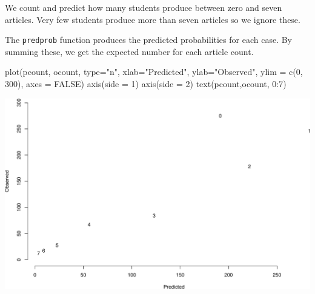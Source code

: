 \documentclass[
  ignorenonframetext,
]{beamer}
\newenvironment{Shaded}{\begin{snugshade}}{\end{snugshade}}
\newcommand{\AttributeTok}[1]{\textcolor[rgb]{0.77,0.63,0.00}{#1}}
\newcommand{\ConstantTok}[1]{\textcolor[rgb]{0.00,0.00,0.00}{#1}}
\newcommand{\DecValTok}[1]{\textcolor[rgb]{0.00,0.00,0.81}{#1}}
\newcommand{\FunctionTok}[1]{\textcolor[rgb]{0.00,0.00,0.00}{#1}}
\newcommand{\NormalTok}[1]{#1}
\newcommand{\OtherTok}[1]{\textcolor[rgb]{0.56,0.35,0.01}{#1}}
\newcommand{\SpecialCharTok}[1]{\textcolor[rgb]{0.00,0.00,0.00}{#1}}
\newcommand{\StringTok}[1]{\textcolor[rgb]{0.31,0.60,0.02}{#1}}
\begin{document}
\begin{frame}[fragile]{}
\protect\hypertarget{section-30}{}
We count and predict how many students produce between zero and seven
articles. Very few students produce more than seven articles so we
ignore these.

\vspace{12pt}

The \texttt{predprob} function produces the predicted probabilities for
each case. By summing these, we get the expected number for each article
count.

\vspace{12pt}
\tiny

\begin{Shaded}
\end{Shaded}
\end{frame}

\begin{frame}[fragile]{}
\protect\hypertarget{section-31}{}
\tiny

\begin{Shaded}
\begin{Highlighting}[]
\FunctionTok{plot}\NormalTok{(pcount, ocount, }\AttributeTok{type=}\StringTok{"n"}\NormalTok{, }\AttributeTok{xlab=}\StringTok{"Predicted"}\NormalTok{, }\AttributeTok{ylab=}\StringTok{"Observed"}\NormalTok{, }
     \AttributeTok{ylim =} \FunctionTok{c}\NormalTok{(}\DecValTok{0}\NormalTok{, }\DecValTok{300}\NormalTok{), }\AttributeTok{axes =} \ConstantTok{FALSE}\NormalTok{)}
\FunctionTok{axis}\NormalTok{(}\AttributeTok{side =} \DecValTok{1}\NormalTok{)}
\FunctionTok{axis}\NormalTok{(}\AttributeTok{side =} \DecValTok{2}\NormalTok{)}
\FunctionTok{text}\NormalTok{(pcount,ocount, }\DecValTok{0}\SpecialCharTok{:}\DecValTok{7}\NormalTok{)}
\end{Highlighting}
\end{Shaded}

\includegraphics{week5_p1_files/figure-beamer/unnamed-chunk-28-1.pdf}
\end{frame}
\end{document}
